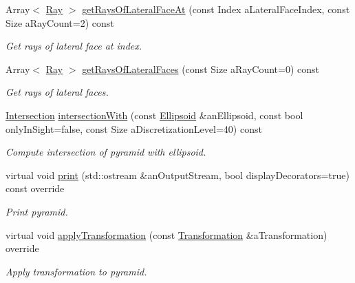 \begin{DoxyCompactItemize}
Array$<$ \hyperlink{classlibrary_1_1math_1_1geom_1_1d3_1_1objects_1_1_ray}{Ray} $>$ \hyperlink{classlibrary_1_1math_1_1geom_1_1d3_1_1objects_1_1_pyramid_a455aad7bd45e9a180cc8eb0082f9bfcf}{get\+Rays\+Of\+Lateral\+Face\+At} (const Index a\+Lateral\+Face\+Index, const Size a\+Ray\+Count=2) const
\begin{DoxyCompactList}\small\item\em Get rays of lateral face at index. \end{DoxyCompactList}\item 
Array$<$ \hyperlink{classlibrary_1_1math_1_1geom_1_1d3_1_1objects_1_1_ray}{Ray} $>$ \hyperlink{classlibrary_1_1math_1_1geom_1_1d3_1_1objects_1_1_pyramid_ab73146c08e94315b9a7dc2392e450f79}{get\+Rays\+Of\+Lateral\+Faces} (const Size a\+Ray\+Count=0) const
\begin{DoxyCompactList}\small\item\em Get rays of lateral faces. \end{DoxyCompactList}\item 
\hyperlink{classlibrary_1_1math_1_1geom_1_1d3_1_1_intersection}{Intersection} \hyperlink{classlibrary_1_1math_1_1geom_1_1d3_1_1objects_1_1_pyramid_a299c41f4cbd61ec24799815dfd7c386d}{intersection\+With} (const \hyperlink{classlibrary_1_1math_1_1geom_1_1d3_1_1objects_1_1_ellipsoid}{Ellipsoid} \&an\+Ellipsoid, const bool only\+In\+Sight=false, const Size a\+Discretization\+Level=40) const
\begin{DoxyCompactList}\small\item\em Compute intersection of pyramid with ellipsoid. \end{DoxyCompactList}\item 
virtual void \hyperlink{classlibrary_1_1math_1_1geom_1_1d3_1_1objects_1_1_pyramid_a150cd331b3dc6e36c74b37bc6988f019}{print} (std\+::ostream \&an\+Output\+Stream, bool display\+Decorators=true) const override
\begin{DoxyCompactList}\small\item\em Print pyramid. \end{DoxyCompactList}\item 
virtual void \hyperlink{classlibrary_1_1math_1_1geom_1_1d3_1_1objects_1_1_pyramid_a79d9b11e42c47213e2eb9538e52a2103}{apply\+Transformation} (const \hyperlink{classlibrary_1_1math_1_1geom_1_1d3_1_1_transformation}{Transformation} \&a\+Transformation) override
\begin{DoxyCompactList}\small\item\em Apply transformation to pyramid. \end{DoxyCompactList}\end{DoxyCompactItemize}
